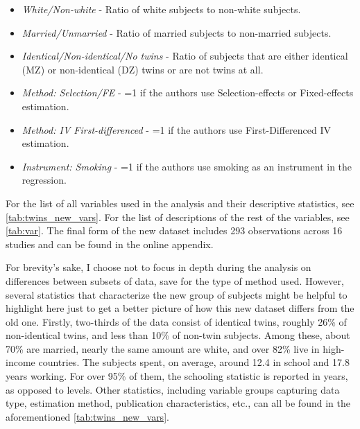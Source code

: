\begin{itemize}
  \item \textit{White/Non-white} - Ratio of white subjects to non-white subjects.
  \item \textit{Married/Unmarried} - Ratio of married subjects to non-married subjects.
  \item \textit{Identical/Non-identical/No twins} - Ratio of subjects that are either identical (MZ) or non-identical (DZ) twins or are not twins at all.
  \item \textit{Method: Selection/FE} - =1 if the authors use  Selection-effects or Fixed-effects estimation.
  \item \textit{Method: IV First-differenced} - =1 if the authors use First-Differenced IV estimation.
  \item \textit{Instrument: Smoking} - =1 if the authors use smoking as an instrument in the regression.
\end{itemize}



For the list of all variables used in the analysis and their descriptive statistics, see \autoref{tab:twins_new_vars}. For the list of descriptions of the rest of the variables, see \autoref{tab:var}. The final form of the new dataset includes 293 observations across 16 studies and can be found in the online appendix.





For brevity's sake, I choose not to focus in depth during the analysis on differences between subsets of data, save for the type of method used. However, several statistics that characterize the new group of subjects might be helpful to highlight here just to get a better picture of how this new dataset differs from the old one. Firstly, two-thirds of the data consist of identical twins, roughly 26\% of non-identical twins, and less than 10\% of non-twin subjects. Among these, about 70\% are married, nearly the same amount are white, and over 82\% live in high-income countries. The subjects spent, on average, around 12.4 in school and 17.8 years working. For over 95\% of them, the schooling statistic is reported in years, as opposed to levels. Other statistics, including variable groups capturing data type, estimation method, publication characteristics, etc., can all be found in the aforementioned \autoref{tab:twins_new_vars}.

